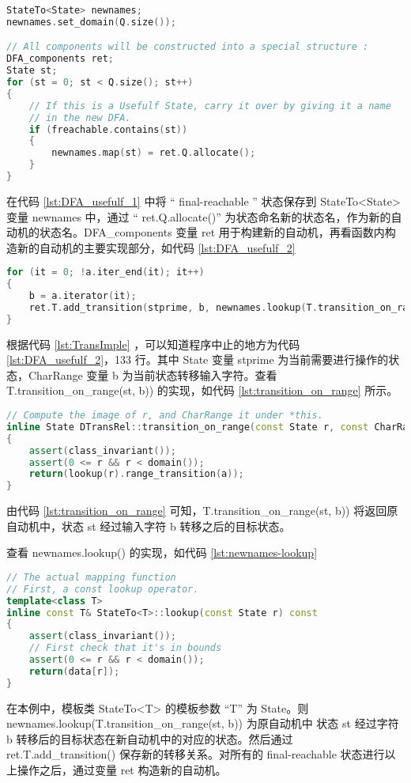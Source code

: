 \begin{lstlisting}[language=C++,label={lst:DFA_usefulf_1},caption={ DFA.cpp },firstnumber=84]
StateTo<State> newnames;
newnames.set_domain(Q.size());

// All components will be constructed into a special structure :
DFA_components ret;
State st;
for (st = 0; st < Q.size(); st++)
{
    // If this is a Usefulf State, carry it over by giving it a name
    // in the new DFA.
    if (freachable.contains(st))
    {
        newnames.map(st) = ret.Q.allocate();
    }
}
\end{lstlisting}
在代码 \ref{lst:DFA_usefulf_1} 中将 “ final-reachable ” 状态保存到 StateTo<State> 变量 newnames 中，通过 “ ret.Q.allocate()” 为状态命名新的状态名，作为新的自动机的状态名。DFA\_components 变量 ret 用于构建新的自动机，再看函数内构造新的自动机的主要实现部分，如代码 \ref{lst:DFA_usefulf_2}

\begin{lstlisting}[language=C++,label={lst:DFA_usefulf_2},caption={ DFA.cpp },firstnumber=130]
for (it = 0; !a.iter_end(it); it++)
{
    b = a.iterator(it);
    ret.T.add_transition(stprime, b, newnames.lookup(T.transition_on_range(st, b)));
}
\end{lstlisting}

根据代码 \ref{lst:TransImple} ，可以知道程序中止的地方为代码 \ref{lst:DFA_usefulf_2}，133 行。其中 State 变量 stprime 为当前需要进行操作的状态，CharRange 变量 b 为当前状态转移输入字符。查看 T.transition\_on\_range(st, b)) 的实现，如代码 \ref{lst:transition_on_range} 所示。

\begin{lstlisting}[language=C++,label={lst:transition_on_range},caption={ DTransRel.cpp },firstnumber=108]
// Compute the image of r, and CharRange it under *this.
inline State DTransRel::transition_on_range(const State r, const CharRange a) const
{
    assert(class_invariant());
    assert(0 <= r && r < domain());
    return(lookup(r).range_transition(a));
}
\end{lstlisting}
由代码 \ref{lst:transition_on_range} 可知，T.transition\_on\_range(st, b)) 将返回原自动机中，状态 st 经过输入字符 b 转移之后的目标状态。

查看 newnames.lookup() 的实现，如代码 \ref{lst:newnames-lookup}

\begin{lstlisting}[language=C++,label={lst:newnames-lookup},caption={ StateTo.h },firstnumber=177]
// The actual mapping function
// First, a const lookup operator.
template<class T>
inline const T& StateTo<T>::lookup(const State r) const
{
    assert(class_invariant());
    // First check that it's in bounds
    assert(0 <= r && r < domain());
    return(data[r]);
}
\end{lstlisting}
在本例中，模板类 StateTo<T> 的模板参数 “T” 为 State。则 newnames.lookup(T.transition\_on\_range(st, b)) 为原自动机中 状态 st 经过字符 b 转移后的目标状态在新自动机中的对应的状态。然后通过 ret.T.add\_transition() 保存新的转移关系。对所有的 final-reachable 状态进行以上操作之后，通过变量 ret 构造新的自动机。 

